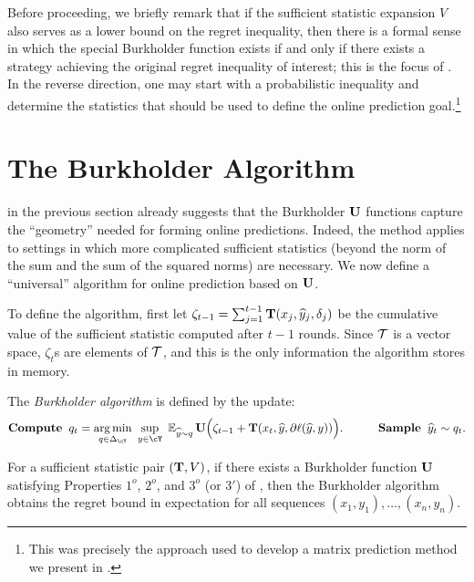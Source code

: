 Before proceeding, we briefly remark that if the sufficient statistic expansion $V$ also serves as a lower bound on the regret inequality, then there is a formal sense in which the special Burkholder function exists if and only if there exists a strategy achieving the original regret inequality of interest; this is the focus of . In the reverse direction, one may start with a probabilistic inequality and determine the statistics that should be used to define the online prediction goal.\footnote{This was precisely the approach used to develop a matrix prediction method we present in .}

\section{The Burkholder Algorithm}
\label{sec:algorithm}

 in the previous section already suggests that the Burkholder $\mathbf{U}$ functions capture the ``geometry'' needed for forming online predictions. Indeed, the method applies to settings in which more complicated sufficient statistics (beyond the norm of the sum and the sum of the squared norms) are necessary. %
We now define a ``universal'' algorithm for online prediction based on $\mathbf{U}$.

To define the algorithm, first let
$\zeta_{t-1} = \sum_{j=1}^{t-1} \mathbf{T}(x_j,{\widehat{y}}_j,\delta_j)$
be the cumulative value of the sufficient statistic computed after $t-1$ rounds. Since $\mathcal{T}$ is a vector space, $\zeta_{t}$s are elements of $\mathcal{T}$, and this is the only information the algorithm stores in memory. 

The \emph{Burkholder algorithm} is defined by the update:
\begin{align}
	\label{eq:univ_algo}
\textbf{Compute}\;\; q_t  = \argmin_{q\in\Delta_{\cY}} ~\sup_{y\in\cY}~ \En_{\pred\sim q} \burk\Big(\zeta_{t-1} + \suff(x_t,\pred,\partial \loss(\pred,y))\Big).
\quad\quad\quad\textbf{Sample}\;\;\pred_{t}\sim{}q_t.
\end{align}

\begin{lemma}
  \label{lem:universal_algo}
	For a sufficient statistic pair $(\mathbf{T},V)$, if there exists a Burkholder function $\mathbf{U}$ satisfying Properties $1^o$, $2^o$, and $3^o$ (or $3'$) of , then the Burkholder algorithm  obtains the regret bound  in expectation for all sequences $(x_1,y_1),\ldots,(x_n,y_n)$. 
\end{lemma}


